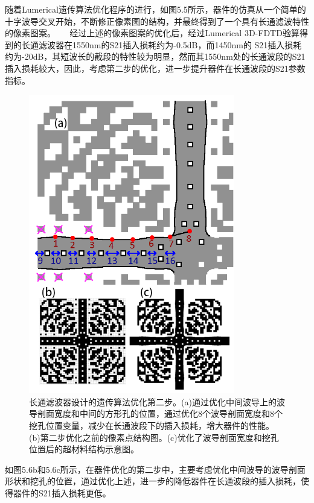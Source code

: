 随着Lumerical遗传算法优化程序的进行，如图5.5所示，器件的仿真从一个简单的十字波导交叉开始，不断修正像素图的结构，并最终得到了一个具有长通滤波特性的像素图案。
　
经过上述的像素图案的优化后，经过Lumerical 3D-FDTD验算得到的长通滤波器在1550nm的S21插入损耗约为-0.5dB，而1450nm的 S21插入损耗约为-20dB，其短波长的截段的特性较为明显，然而其1550nm处的长通波段的S21插入损耗较大，因此，考虑第二步的优化，进一步提升器件在长通波段的S21参数指标。

\begin{figure}[!htbp]
    \centering
    \includegraphics[width=0.8\textwidth]{Img/5-6.png}
    \caption{长通滤波器设计的遗传算法优化第二步。(a)通过优化中间波导上的波导剖面宽度和中间的方形孔的位置，通过优化8个波导剖面宽度和8个挖孔位置变量，减少在长通波段下的插入损耗，增大器件的性能。(b)第二步优化之前的像素点结构图。(c)优化了波导剖面宽度和挖孔位置后的超材料结构示意图。}
    \label{fig:5-6}
\end{figure}

如图5.6b和5.6c所示，在器件优化的第二步中，主要考虑优化中间波导的波导剖面形状和挖孔的位置，通过优化上述，进一步的降低器件在长通波段的插入损耗，使得器件的S21插入损耗更低。
 
